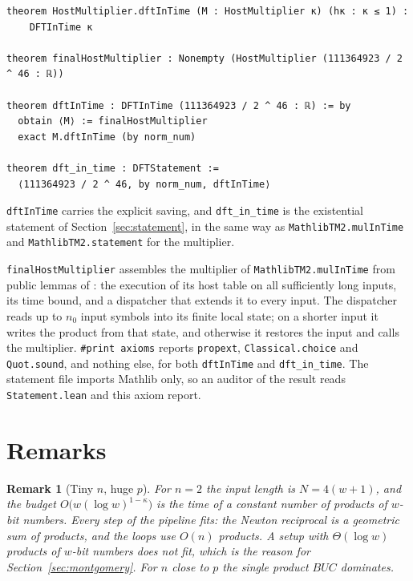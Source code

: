 \documentclass[11pt]{amsart}
\newtheorem{remark}[lemma]{Remark}
\newcommand{\lean}[1]{\texttt{#1}}
\begin{document}
\noindent\begin{minipage}{\linewidth}
\begin{lstlisting}
theorem HostMultiplier.dftInTime (M : HostMultiplier κ) (hκ : κ ≤ 1) :
    DFTInTime κ

theorem finalHostMultiplier : Nonempty (HostMultiplier (111364923 / 2 ^ 46 : ℝ))

theorem dftInTime : DFTInTime (111364923 / 2 ^ 46 : ℝ) := by
  obtain ⟨M⟩ := finalHostMultiplier
  exact M.dftInTime (by norm_num)

theorem dft_in_time : DFTStatement :=
  ⟨111364923 / 2 ^ 46, by norm_num, dftInTime⟩
\end{lstlisting}
\end{minipage}

\lean{dftInTime} carries the explicit saving, and \lean{dft\_in\_time} is the existential
statement of Section~\ref{sec:statement}, in the same way as \lean{MathlibTM2.mulInTime} and
\lean{MathlibTM2.statement} for the multiplier.

\lean{finalHostMultiplier} assembles the multiplier of \lean{MathlibTM2.mulInTime} from
public lemmas of \cite{IMB}: the execution of its host table on all sufficiently long inputs,
its time bound, and a dispatcher that extends it to every input. The dispatcher reads up to
$n_0$ input symbols into its finite local state; on a shorter input it writes the product from
that state, and otherwise it restores the input and calls the multiplier.
\lean{\#print axioms} reports \lean{propext}, \lean{Classical.choice} and
\lean{Quot.sound}, and nothing else, for both \lean{dftInTime} and \lean{dft\_in\_time}. The statement file imports
Mathlib only, so an auditor of the result reads \lean{Statement.lean} and this axiom report.

\section{Remarks}

\begin{remark}[Tiny $n$, huge $p$]
For $n = 2$ the input length is $N = 4(w+1)$, and the budget
$O\bigl(w (\log w)^{1-\kappa}\bigr)$ is the time of a constant number of products of $w$-bit
numbers. Every step of the pipeline fits: the Newton reciprocal is a geometric sum of products,
and the loops use $O(n)$ products. A setup with $\Theta(\log w)$ products of $w$-bit numbers
does not fit, which is the reason for Section~\ref{sec:montgomery}. For $n$ close to $p$ the
single product $BUC$ dominates.
\end{remark}
\end{document}
